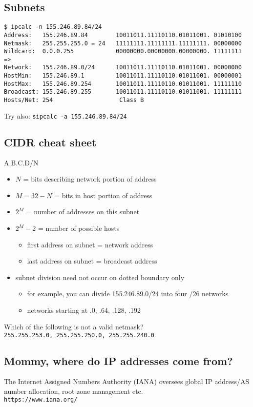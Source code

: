 \documentclass[xga]{xdvislides}
\begin{document}
\subsection{Subnets}
\begin{verbatim}
$ ipcalc -n 155.246.89.84/24
Address:   155.246.89.84        10011011.11110110.01011001. 01010100
Netmask:   255.255.255.0 = 24   11111111.11111111.11111111. 00000000
Wildcard:  0.0.0.255            00000000.00000000.00000000. 11111111
=>
Network:   155.246.89.0/24      10011011.11110110.01011001. 00000000
HostMin:   155.246.89.1         10011011.11110110.01011001. 00000001
HostMax:   155.246.89.254       10011011.11110110.01011001. 11111110
Broadcast: 155.246.89.255       10011011.11110110.01011001. 11111111
Hosts/Net: 254                   Class B
\end{verbatim}
\vspace{.5in}
Try also: \verb+sipcalc -a 155.246.89.84/24+

\subsection{CIDR cheat sheet}
A.B.C.D/N
\begin{itemize}
	\item $N$ = bits describing network portion of address
	\item $M=32-N$ = bits in host portion of address
	\item $2^M$ = number of addresses on this subnet
	\item $2^M - 2$ = number of possible hosts
		\begin{itemize}
			\item first address on subnet = network address
			\item last address on subnet = broadcast address
		\end{itemize}
	\item subnet division need not occur on dotted boundary only
		\begin{itemize}
			\item for example, you can divide 155.246.89.0/24
				into four /26 networks
			\item networks starting at .0, .64, .128, .192
		\end{itemize}
\end{itemize}
\addvspace{.5in}
Which of the following is not a valid netmask? \\
\verb+255.255.253.0, 255.255.250.0, 255.255.240.0+

\subsection{Mommy, where do IP addresses come from?}
\Huge
\vfill
\begin{center}
The Internet Assigned Numbers Authority (IANA) oversees global IP
address/AS number allocation, root zone management etc.
\\
\vspace{.5in}
\verb+https://www.iana.org/+
\end{center}
\vfill
\Normalsize
\end{document}
